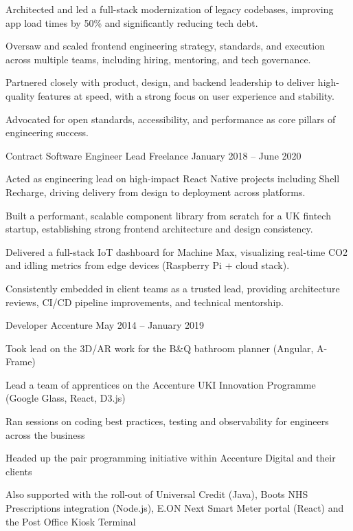 \documentclass[]{resume-format}
\begin{document}
\begin{cventries}
{\begin{cvitems}
        \item { Architected and led a full-stack modernization of legacy codebases, improving app load times by 50\% and significantly reducing tech debt. }
        \item { Oversaw and scaled frontend engineering strategy, standards, and execution across multiple teams, including hiring, mentoring, and tech governance. }
        \item { Partnered closely with product, design, and backend leadership to deliver high-quality features at speed, with a strong focus on user experience and stability. }
        \item { Advocated for open standards, accessibility, and performance as core pillars of engineering success. }
    \end{cvitems}}
    \cventry
    { Contract Software Engineer Lead }
    { Freelance }
    {}
    { January 2018 – June 2020 }
    {\begin{cvitems}
        \item { Acted as engineering lead on high-impact React Native projects including Shell Recharge, driving delivery from design to deployment across platforms. }
        \item { Built a performant, scalable component library from scratch for a UK fintech startup, establishing strong frontend architecture and design consistency. }
        \item { Delivered a full-stack IoT dashboard for Machine Max, visualizing real-time CO2 and idling metrics from edge devices (Raspberry Pi + cloud stack). }
        \item { Consistently embedded in client teams as a trusted lead, providing architecture reviews, CI/CD pipeline improvements, and technical mentorship. }
    \end{cvitems}}
    \cventry
    { Developer }
    { Accenture }
    {}
    { May 2014 – January 2019 }
    {\begin{cvitems}
        \item { Took lead on the 3D/AR work for the B\&Q bathroom planner (Angular, A-Frame) }
        \item { Lead a team of apprentices on the Accenture UKI Innovation Programme (Google Glass, React, D3.js) }
        \item { Ran sessions on coding best practices, testing and observability for engineers across the business }
        \item { Headed up the pair programming initiative within Accenture Digital and their clients }
        \item { Also supported with the roll-out of Universal Credit (Java), Boots NHS Prescriptions integration (Node.js), E.ON Next Smart Meter portal (React) and the Post Office Kiosk Terminal }
    \end{cvitems}}
\end{cventries}
\end{document}

